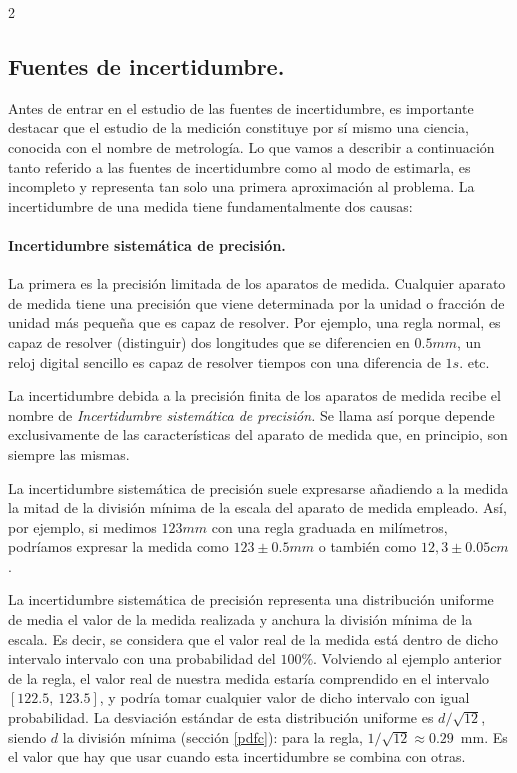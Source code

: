 \begin{paracol}{2}
\subsection{Fuentes de incertidumbre.}\label{fdi}

Antes de entrar en el estudio de las fuentes de incertidumbre, es importante destacar que el estudio de la medición constituye por sí mismo una ciencia, conocida con el nombre de metrología. Lo que vamos a describir a continuación tanto referido a las fuentes de incertidumbre como al modo de estimarla, es incompleto y representa tan solo una primera aproximación al problema.
La incertidumbre de una medida tiene fundamentalmente dos causas:

\paragraph{Incertidumbre sistemática de precisión.}
 La primera es la precisión limitada de los aparatos de medida. Cualquier aparato de medida tiene una precisión que viene determinada por la unidad o fracción de unidad más pequeña que es capaz de resolver. Por ejemplo, una regla normal, es capaz de resolver (distinguir) dos longitudes que se diferencien en $0.5 mm$, un reloj digital sencillo es capaz de resolver tiempos con una diferencia de $1s.$ etc.
 
La incertidumbre debida a la precisión finita de los aparatos de medida recibe el nombre de \emph{Incertidumbre sistemática de precisión.} 
Se llama así porque depende exclusivamente de las características del aparato de medida que, en principio, son siempre las mismas.

La incertidumbre sistemática de precisión suele expresarse añadiendo a la medida la mitad de la división mínima de la escala del aparato de medida empleado. Así, por ejemplo, si medimos $123 mm$ con una regla graduada en milímetros, podríamos expresar la  medida como $123 \pm 0.5 mm$ o también como $12,3\pm0.05cm$.


La incertidumbre sistemática de precisión representa una distribución uniforme de media el valor de la medida realizada y anchura la división mínima de la escala. Es decir, se considera que el valor real de la medida está dentro de dicho intervalo intervalo con una probabilidad del $100\%$. Volviendo al ejemplo anterior de la regla, el valor real de nuestra medida estaría comprendido en el intervalo $[122.5,\ 123.5 ]$, y podría tomar cualquier valor de dicho intervalo con igual probabilidad. La desviación estándar de esta distribución uniforme es $d/\sqrt{12}$, siendo $d$ la división mínima (sección \ref{pdfc}): para la regla, $1/\sqrt{12}\approx 0.29$~mm. Es el valor que hay que usar cuando esta incertidumbre se combina con otras.


\end{paracol}
